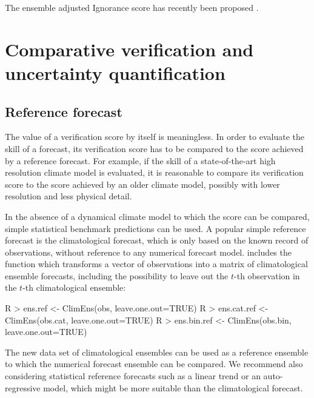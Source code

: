 \documentclass[article]{jss}
\begin{document}
The ensemble adjusted Ignorance score has recently been proposed \citep{siegert2015ignorance}.





\section{Comparative verification and uncertainty quantification}


\subsection{Reference forecast}

The value of a verification score by itself is meaningless.
In order to evaluate the skill of a forecast, its verification score has to be compared to the score achieved by a reference forecast.
For example, if the skill of a state-of-the-art high resolution climate model is evaluated, it is reasonable to compare its verification score to the score achieved by an older climate model, possibly with lower resolution and less physical detail.

In the absence of a dynamical climate model to which the score can be compared, simple statistical benchmark predictions can be used.
A popular simple reference forecast is the climatological forecast, which is only based on the known record of observations, without reference to any numerical forecast model.
 includes the function  which transforms a vector of observations into a matrix of climatological ensemble forecasts, including the possibility to leave out the $t$-th observation in the $t$-th climatological ensemble:

\begin{Schunk}
\begin{Sinput}
R > ens.ref     <- ClimEns(obs,     leave.one.out=TRUE)
R > ens.cat.ref <- ClimEns(obs.cat, leave.one.out=TRUE)
R > ens.bin.ref <- ClimEns(obs.bin, leave.one.out=TRUE)
\end{Sinput}
\end{Schunk}

The new data set of climatological ensembles can be used as a reference ensemble to which the numerical forecast ensemble can be compared.
We recommend also considering statistical reference forecasts such as a linear trend or an auto-regressive model, which might be more suitable than the climatological forecast.
\end{document}
